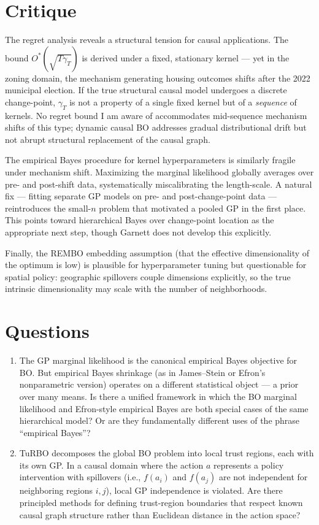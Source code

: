 \documentclass[11pt,twoside]{article}
\begin{document}
\section*{Critique}
The regret analysis reveals a structural tension for causal applications. The bound $O^*(\sqrt{T\gamma_T})$ is derived under a fixed, stationary kernel --- yet in the zoning domain, the mechanism generating housing outcomes shifts after the 2022 municipal election. If the true structural causal model undergoes a discrete change-point, $\gamma_T$ is not a property of a single fixed kernel but of a \textit{sequence} of kernels. No regret bound I am aware of accommodates mid-sequence mechanism shifts of this type; dynamic causal BO \citep{aglietti2021dcbo} addresses gradual distributional drift but not abrupt structural replacement of the causal graph.

The empirical Bayes procedure for kernel hyperparameters is similarly fragile under mechanism shift. Maximizing the marginal likelihood globally averages over pre- and post-shift data, systematically miscalibrating the length-scale. A natural fix --- fitting separate GP models on pre- and post-change-point data --- reintroduces the small-$n$ problem that motivated a pooled GP in the first place. This points toward hierarchical Bayes over change-point location as the appropriate next step, though Garnett does not develop this explicitly.

Finally, the REMBO embedding assumption (that the effective dimensionality of the optimum is low) is plausible for hyperparameter tuning but questionable for spatial policy: geographic spillovers couple dimensions explicitly, so the true intrinsic dimensionality may scale with the number of neighborhoods.

\section*{Questions}
\begin{enumerate}
    \item The GP marginal likelihood is the canonical empirical Bayes objective for BO. But empirical Bayes shrinkage (as in James--Stein or Efron's nonparametric version) operates on a different statistical object --- a prior over many means. Is there a unified framework in which the BO marginal likelihood and Efron-style empirical Bayes are both special cases of the same hierarchical model? Or are they fundamentally different uses of the phrase ``empirical Bayes''?
    \item TuRBO decomposes the global BO problem into local trust regions, each with its own GP. In a causal domain where the action $a$ represents a policy intervention with spillovers (i.e., $f(a_i)$ and $f(a_j)$ are not independent for neighboring regions $i,j$), local GP independence is violated. Are there principled methods for defining trust-region boundaries that respect known causal graph structure rather than Euclidean distance in the action space?
\end{enumerate}
\end{document}
